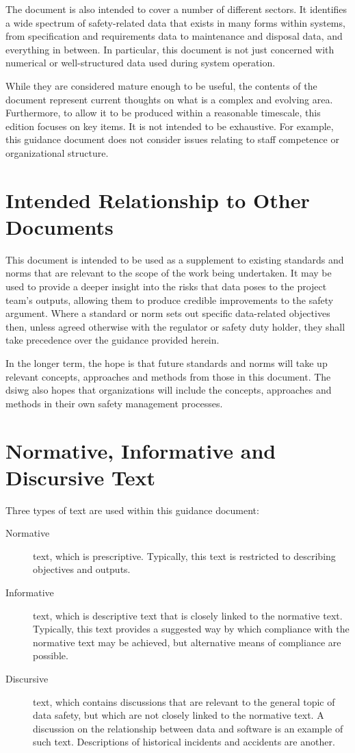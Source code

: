 The document is also intended to cover a number of different sectors. It identifies a wide spectrum of safety-related data that exists in many forms within systems, from specification and requirements data to maintenance and disposal data, and everything in between. In particular, this document is not just concerned with numerical or well-structured data used during system operation.

While they are considered mature enough to be useful, the contents of the document represent current thoughts on what is a complex and evolving area. Furthermore, to allow it to be produced within a reasonable timescale, this edition focuses on key items. It is not intended to be exhaustive. For example, this guidance document does not consider issues relating to staff competence or organizational structure.

\section{Intended Relationship to Other Documents}
This document is intended to be used as a supplement to existing standards and norms that are relevant to the scope of the work being undertaken. It may be used to provide a deeper insight into the risks that data poses to the project team's outputs, allowing them to produce credible improvements to the safety argument. Where a standard or norm sets out specific data-related objectives then, unless agreed otherwise with the regulator or safety duty holder, they shall take precedence over the guidance provided herein.

In the longer term, the hope is that future standards and norms will take up relevant concepts, approaches and methods from those in this document. The \gls{dsiwg} also hopes that organizations will include the concepts, approaches and methods in their own safety management processes.

\clearpage %
\section{Normative, Informative and Discursive Text}
Three types of text are used within this guidance document:
\begin{description}
	\item[Normative] text, which is prescriptive. Typically, this text is restricted to describing objectives and outputs.
	\item[Informative] text, which is descriptive text that is closely linked to the normative text. Typically, this text provides a suggested way by which compliance with the normative text may be achieved, but alternative means of compliance are possible.
	\item[Discursive] text, which contains discussions that are relevant to the general topic of data safety, but which are not closely linked to the normative text. A discussion on the relationship between data and software is an example of such text. Descriptions of historical incidents and accidents are another.
\end{description}

